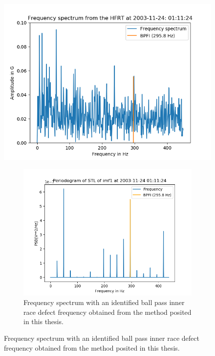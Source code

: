 \documentclass[../Main/thesis.tex]{subfiles}
\begin{document}
	\begin{figure}[H]
		\centering
		\includegraphics[width=0.7\linewidth]{../fig/hfrt}
		\caption{Frequency spectrum with an identified ball pass inner race defect frequency obtained from the high frequency resonance technique (HFRT).}
		\label{fig:hfrt-method}
		
		\begin{figure}[H]
			\centering
			\includegraphics[width=0.7\linewidth]{../fig/periodogram_bpfi/end_imf1_bpfi}
			\caption{Frequency spectrum with an identified ball pass inner race defect frequency obtained from the method posited in this thesis.}
			\label{fig:yapi-method}
		\end{figure}
	\end{figure}
	\label{sec:comp}
\end{document}
